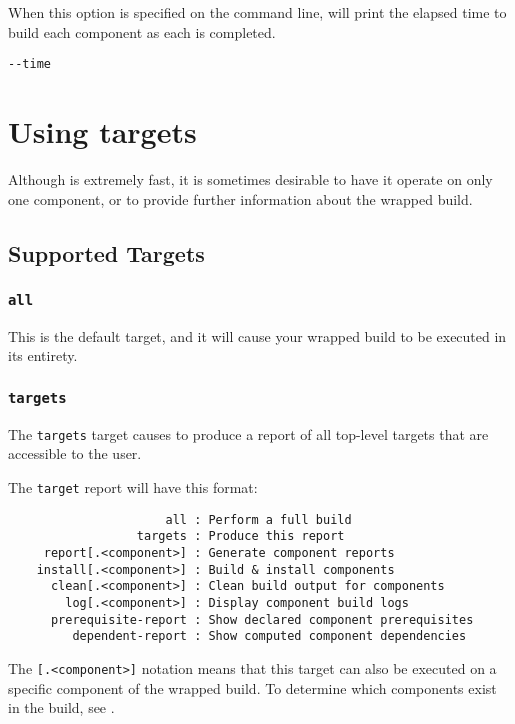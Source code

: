 When this option is specified on the command line, \lmsbw will print
the elapsed time to build each component as each is completed.

\begin{verbatim}
--time
\end{verbatim}


\section{Using \lmsbw \make targets}

Although \lmsbw is extremely fast, it is sometimes desirable to have
it operate on only one component, or to provide further information
about the wrapped build.

\subsection{Supported Targets}
\subsubsection{\texttt{all}}\label{lmsbw:target:all}

This is the default target, and it will cause your wrapped build to be
executed in its entirety.

\subsubsection{\texttt{targets}}

The \texttt{targets} target causes \lmsbw to produce a report of all
top-level targets that are accessible to the user.

The \texttt{target} report will have this format:

\begin{verbatim}
                      all : Perform a full build
                  targets : Produce this report
     report[.<component>] : Generate component reports
    install[.<component>] : Build & install components
      clean[.<component>] : Clean build output for components
        log[.<component>] : Display component build logs
      prerequisite-report : Show declared component prerequisites
         dependent-report : Show computed component dependencies
\end{verbatim}

The \texttt{[.<component>]} notation means that this target can also
be executed on a specific component of the wrapped build.  To
determine which components exist in the build, see
.

